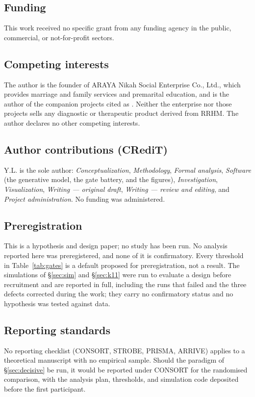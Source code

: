 \documentclass[9pt,twocolumn]{article}
\begin{document}
\subsection*{Funding}
This work received no specific grant from any funding agency in the public, commercial, or not-for-profit sectors.

\subsection*{Competing interests}
The author is the founder of ARAYA Nikah Social Enterprise Co., Ltd., which provides marriage and family services and premarital education, and is the author of the companion projects cited as \cite{lahtee2026ru,lahtee2026rc,lahtee2026birca,lahtee2026srct}. Neither the enterprise nor those projects sells any diagnostic or therapeutic product derived from RRHM. The author declares no other competing interests.

\subsection*{Author contributions (CRediT)}
Y.L. is the sole author: \emph{Conceptualization}, \emph{Methodology}, \emph{Formal analysis}, \emph{Software} (the generative model, the gate battery, and the figures), \emph{Investigation}, \emph{Visualization}, \emph{Writing --- original draft}, \emph{Writing --- review and editing}, and \emph{Project administration}. No funding was administered.

\subsection*{Preregistration}
This is a hypothesis and design paper; no study has been run. No analysis reported here was preregistered, and none of it is confirmatory. Every threshold in Table~\ref{tab:gates} is a default proposed for preregistration, not a result. The simulations of \S\ref{sec:sim} and \S\ref{sec:k11} were run to evaluate a design before recruitment and are reported in full, including the runs that failed and the three defects corrected during the work; they carry no confirmatory status and no hypothesis was tested against data.

\subsection*{Reporting standards}
No reporting checklist (CONSORT, STROBE, PRISMA, ARRIVE) applies to a theoretical manuscript with no empirical sample. Should the paradigm of \S\ref{sec:decisive} be run, it would be reported under CONSORT for the randomised comparison, with the analysis plan, thresholds, and simulation code deposited before the first participant.
\end{document}
